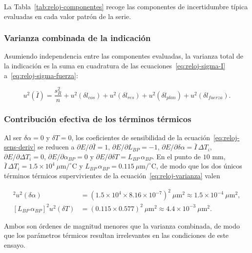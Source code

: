 La Tabla~\ref{tab:reloj-componentes} recoge las componentes de incertidumbre típica
evaluadas en cada valor patrón de la serie.



\subsubsection*{Varianza combinada de la indicación}

Asumiendo independencia entre las componentes evaluadas, la varianza total de la
indicación es la suma en cuadratura de las
ecuaciones~\eqref{eq:reloj-sigma-I} a~\eqref{eq:reloj-sigma-fuerza}:

\begin{equation}
  u^2(\bar{I}) = \frac{s_R^2}{n}
  + u^2(\delta l_{cos}) + u^2(\delta l_{res})
  + u^2(\delta l_{plan}) + u^2(\delta l_{fuerza}).
  \label{eq:reloj-sigma-I-total}
\end{equation}

\subsubsection*{Contribución efectiva de los términos térmicos}

Al ser $\delta\alpha = 0$ y $\delta T = 0$, los coeficientes de sensibilidad de la
ecuación~\eqref{eq:reloj-sens-deriv} se reducen a
$\partial E/\partial\bar I = 1$, $\partial E/\partial L_{BP} = -1$,
$\partial E/\partial\delta\alpha = \bar I\,\Delta T_i$,
$\partial E/\partial\Delta T_i = 0$, $\partial E/\partial\alpha_{BP} = 0$ y
$\partial E/\partial\delta T = L_{BP}\,\alpha_{BP}$. En el punto de $10$ mm,
$\bar I\,\Delta T_i = 1.5\times10^{4}\ \mu\text{m}/^\circ\text{C}$ y
$L_{BP}\,\alpha_{BP} = 0.115\ \mu\text{m}/^\circ\text{C}$, de modo que los dos únicos
términos térmicos supervivientes de la ecuación~\eqref{eq:reloj-varianza} valen

\begin{align}
  [\bar I\,\Delta T_i]^2u^2(\delta\alpha)
  &= (1.5\times10^{4} \times 8.16\times10^{-7})^2\ \mu\text{m}^2
  \approx 1.5\times10^{-4}\ \mu\text{m}^2,
  \label{eq:reloj-termino-dalpha} \\
  [L_{BP}\,\alpha_{BP}]^2u^2(\delta T)
  &= (0.115 \times 0.577)^2\ \mu\text{m}^2
  \approx 4.4\times10^{-3}\ \mu\text{m}^2.
  \label{eq:reloj-termino-dT}
\end{align}

Ambos son órdenes de magnitud menores que la varianza combinada, de modo que los
parámetros térmicos resultan irrelevantes en las condiciones de este ensayo.


